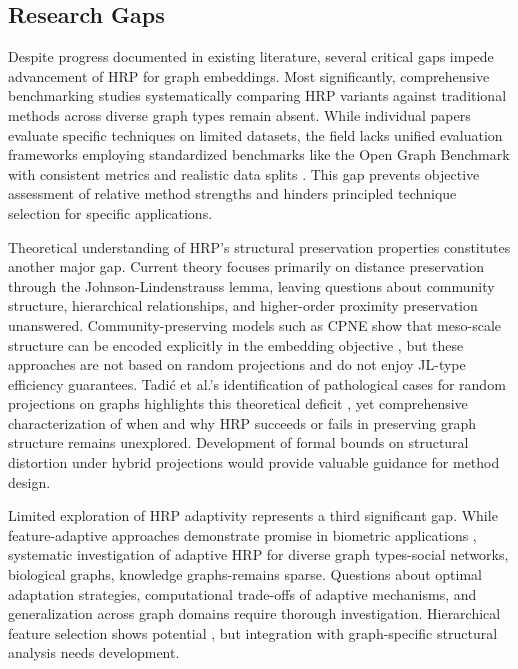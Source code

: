 \documentclass[conference]{IEEEtran}
\begin{document}
\subsection{Research Gaps}

Despite progress documented in existing literature, several critical gaps impede advancement of HRP for graph embeddings. Most significantly, comprehensive benchmarking studies systematically comparing HRP variants against traditional methods across diverse graph types remain absent. While individual papers evaluate specific techniques on limited datasets, the field lacks unified evaluation frameworks employing standardized benchmarks like the Open Graph Benchmark with consistent metrics and realistic data splits \cite{hu2020ogb}. This gap prevents objective assessment of relative method strengths and hinders principled technique selection for specific applications.

Theoretical understanding of HRP's structural preservation properties constitutes another major gap. Current theory focuses primarily on distance preservation through the Johnson-Lindenstrauss lemma, leaving questions about community structure, hierarchical relationships, and higher-order proximity preservation unanswered. Community-preserving models such as CPNE show that meso-scale structure can be encoded explicitly in the embedding objective \cite{wang2017cpne}, but these approaches are not based on random projections and do not enjoy JL-type efficiency guarantees. Tadić et al.'s identification of pathological cases for random projections on graphs highlights this theoretical deficit \cite{tadic2024}, yet comprehensive characterization of when and why HRP succeeds or fails in preserving graph structure remains unexplored. Development of formal bounds on structural distortion under hybrid projections would provide valuable guidance for method design.

Limited exploration of HRP adaptivity represents a third significant gap. While feature-adaptive approaches demonstrate promise in biometric applications \cite{yang2021cancelable}, systematic investigation of adaptive HRP for diverse graph types-social networks, biological graphs, knowledge graphs-remains sparse. Questions about optimal adaptation strategies, computational trade-offs of adaptive mechanisms, and generalization across graph domains require thorough investigation. Hierarchical feature selection shows potential \cite{wang2019hierarchical}, but integration with graph-specific structural analysis needs development.
\end{document}
